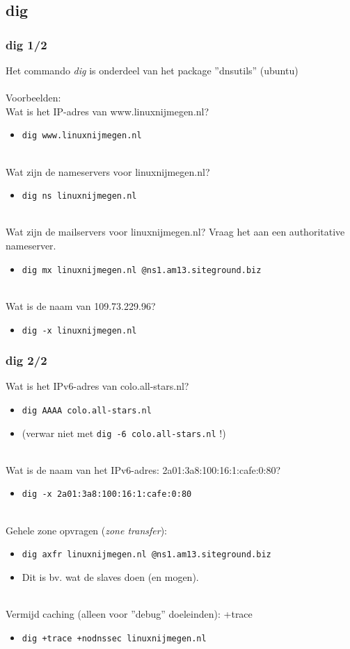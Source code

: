\subsection{dig}
\begin{styleframe}
        \frametitle{dig 1/2}
Het commando {\it dig} is onderdeel van het package ''dnsutils'' (ubuntu)\\
~\\
\pause
Voorbeelden:\\
Wat is het IP-adres van www.linuxnijmegen.nl?
\pause
\begin{itemize}
	\item {\tt dig www.linuxnijmegen.nl}
\end{itemize}
~\\
\pause
Wat zijn de nameservers voor linuxnijmegen.nl?
\pause
\begin{itemize}
	\item {\tt dig ns linuxnijmegen.nl}
\end{itemize}
~\\
\pause
Wat zijn de mailservers voor linuxnijmegen.nl? Vraag het aan een authoritative nameserver.
\pause
\begin{itemize}
	\item {\scriptsize {\tt dig mx linuxnijmegen.nl @ns1.am13.siteground.biz}}
\end{itemize}
~\\
\pause
Wat is de naam van 109.73.229.96?
\pause
\begin{itemize}
	\item {\tt dig -x linuxnijmegen.nl}
\end{itemize}
\end{styleframe}

\begin{styleframe}
        \frametitle{dig 2/2}
Wat is het IPv6-adres van colo.all-stars.nl?
\pause
\begin{itemize}
	\item {\tt dig AAAA colo.all-stars.nl}
	\item[] (verwar niet met {\tt dig -6 colo.all-stars.nl} !)
\end{itemize}
~\\
\pause
{\footnotesize Wat is de naam van het IPv6-adres: 2a01:3a8:100:16:1:cafe:0:80?}
\pause
\begin{itemize}
	\item {\tt dig -x 2a01:3a8:100:16:1:cafe:0:80}
\end{itemize}
~\\
\pause
Gehele zone opvragen ({\it zone transfer}):
\pause
\begin{itemize}
	\item {\scriptsize {\tt dig axfr linuxnijmegen.nl @ns1.am13.siteground.biz}}
	\item[] Dit is bv. wat de slaves doen (en mogen).
\end{itemize}
~\\
\pause
Vermijd caching (alleen voor ''debug'' doeleinden): +trace
\pause
\begin{itemize}
	\item {\tt dig +trace +nodnssec linuxnijmegen.nl}
\end{itemize}
\end{styleframe}

